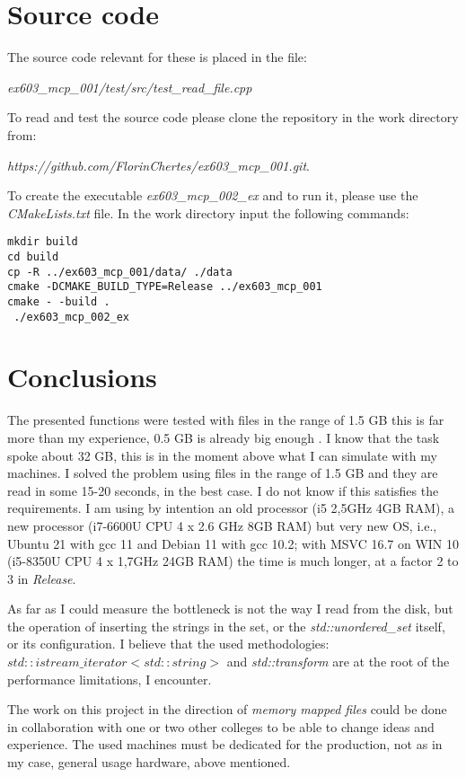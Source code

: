 \documentclass{article}
\begin{document}
\section{Source code}
The source code relevant for these is placed in the file:

 \textit{ex603\_mcp\_001/test/src/test\_read\_file.cpp} 

\noindent To read and test the source code please clone the repository in the work directory from:

\textit{https://github.com/FlorinChertes/ex603\_mcp\_001.git}.

\noindent To create the executable \textit{ex603\_mcp\_002\_ex} and to run it, please use the \textit{CMakeLists.txt} file. In the work directory input the following commands:
\begin{lstlisting}
mkdir build
cd build
cp -R ../ex603_mcp_001/data/ ./data
cmake -DCMAKE_BUILD_TYPE=Release ../ex603_mcp_001
cmake - -build .
 ./ex603_mcp_002_ex
\end{lstlisting}



\section{Conclusions}

The presented functions were tested with files in the range of 1.5 GB this is far more than my experience, 0.5 GB is already big enough .  I know that the task spoke about 32 GB, this is in the moment above what I can simulate with my machines. I solved the problem using files in the range of 1.5 GB and they are read in some 15-20 seconds, in the best case. I do not know if this satisfies the requirements. I am using by intention an old processor (i5 2,5GHz 4GB RAM), a new processor (i7-6600U CPU 4 x 2.6 GHz 8GB RAM) but very new OS, i.e., Ubuntu 21 with gcc 11 and Debian 11 with gcc 10.2; with MSVC 16.7 on WIN 10 (i5-8350U CPU 4 x 1,7GHz 24GB RAM) the time is much longer, at a factor 2 to 3 in \textit{Release}.

As far as I could measure the bottleneck is not the way I read from the disk, but the operation of inserting the strings in the set, or the \textit{std::unordered\_set} itself, or its configuration. I believe that the used methodologies: $std::istream\_iterator<std::string>$ and \textit{std::transform} are at the root of the performance limitations, I encounter.

The work on this project in the direction of \textit{memory mapped files} could be done in collaboration with one or two other colleges to be able to change ideas and experience. The used machines must be dedicated for the production, not as in my case, general usage hardware, above mentioned.
\end{document}
